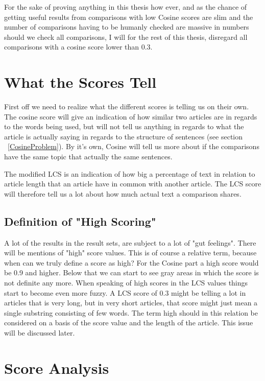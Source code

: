 For the sake of proving anything in this thesis how ever, and as the chance of getting useful results from comparisons with low Cosine scores are slim and the number of comparisons having to be humanly checked are massive in numbers should we check all comparisons, I will for the rest of this thesis, disregard all comparisons with a cosine score lower than 0.3.

\section{What the Scores Tell}
First off we need to realize what the different scores is telling us on their own. The cosine score will give an indication of how similar two articles are in regards to the words being used, but will not tell us anything in regards to what the article is actually saying in regards to the structure of sentences (see section ~\ref{CosineProblem}). By it's own, Cosine will tell us more about if the comparisons have the same topic that actually the same sentences. 

The modified LCS is an indication of how big a percentage of text in relation to article length that an article have in common with another article. The LCS score will therefore tell us a lot about how much actual text a comparison shares. 

\subsection{Definition of "High Scoring"}
A lot of the results in the result sets, are subject to a lot of "gut feelings". There will be mentions of "high" score values. This is of course a relative term, because when can we truly define a score as high? For the Cosine part a high score would be 0.9 and higher. Below that we can start to see gray areas in which the score is not definite any more. When speaking of high scores in the LCS values things start to become even more fuzzy. A LCS score of 0.3 might be telling a lot in articles that is very long, but in very short articles, that score might just mean a single substring consisting of few words. The term high should in this relation be considered on a basis of the score value and the length of the article. This issue will be discussed later.

\section{Score Analysis}

